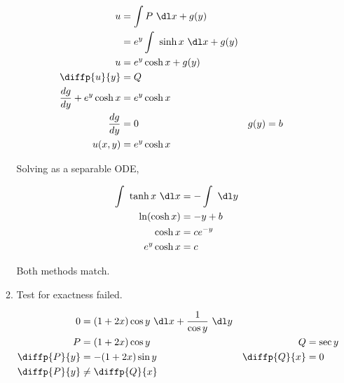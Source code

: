 \begin{enumerate}
\begin{enumerate}
                    \begin{align}
                        u                            & = \int P\ \dl x + g(y)                          \\
                                                     & = e^{y}\int\ \sinh x\ \dl x + g(y)              \\
                        u                            & = e^{y} \cosh x + g(y)                          \\
                        \diffp{u}{y}                 & = Q                                             \\
                        \frac{dg}{dy} + e^{y}\cosh x & = e^{y}\cosh x                                  \\
                        \frac{dg}{dy}                & = 0                                & g(y) & = b \\
                        u(x, y)                      & = e^{y} \cosh x
                    \end{align}


                    Solving as a separable ODE,

                    \begin{align}
                        \int\ \tanh x\ \dl x & = -\int\ \dl y \\
                        \ln (\cosh x)        & = -y + b       \\
                        \cosh x              & = ce^{-y}      \\
                        e^{y}\cosh x         & = c
                    \end{align}

                    Both methods match.

              \item Test for exactness failed.

                    \begin{align}
                        0            & = (1+2x) \cos y\ \dl x + \frac{1}{\cos y} \ \dl y                           \\
                        P            & = (1+2x) \cos y                                   & Q            & = \sec y \\
                        \diffp{P}{y} & = -(1+2x) \sin y                                  & \diffp{Q}{x} & = 0      \\
                        \diffp{P}{y} & \neq \diffp{Q}{x}
                    \end{align}


\end{enumerate}
\end{enumerate}
